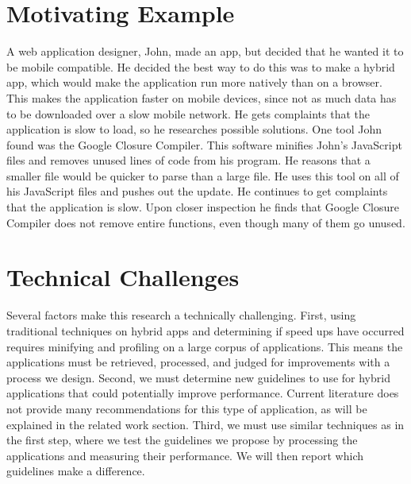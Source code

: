 \documentclass{acm_proc_article-sp}
\begin{document}
\section{Motivating Example}
A web application designer, John, made an app, but decided that he wanted it to be mobile compatible.
He decided the best way to do this was to make a hybrid app, which would make the application run more natively than on a browser.
This makes the application faster on mobile devices, since not as much data has to be downloaded over a slow mobile network.
He gets complaints that the application is slow to load, so he researches possible solutions.
One tool John found was the Google Closure Compiler.
This software minifies John's JavaScript files and removes unused lines of code from his program.
He reasons that a smaller file would be quicker to parse than a large file.
He uses this tool on all of his JavaScript files and pushes out the update.
He continues to get complaints that the application is slow.
Upon closer inspection he finds that Google Closure Compiler does not remove entire functions, even though many of them go unused.  

\section{Technical Challenges}
Several factors make this research a technically challenging.
First, using traditional techniques on hybrid apps and determining if speed ups have occurred requires minifying and profiling on a large corpus of applications.
This means the applications must be retrieved, processed, and judged for improvements with a process we design.
Second, we must determine new guidelines to use for hybrid applications that could potentially improve performance.
Current literature does not provide many recommendations for this type of application, as will be explained in the related work section.
Third, we must use similar techniques as in the first step, where we test the guidelines we propose by processing the applications and measuring their performance.  We will then report which guidelines make a difference.
\end{document}
